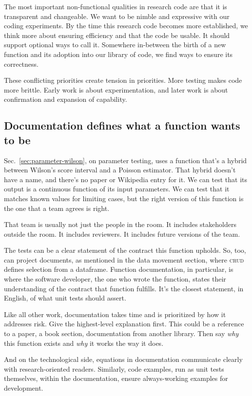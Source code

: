 \documentclass[fleqn,10pt]{olplainarticle}
\begin{document}
The most important non-functional qualities in research code are that it
is transparent and changeable. We want to be nimble and expressive
with our coding experiments. By the time this research code
becomes more established, we think more about ensuring efficiency
and that the code be usable. It should support optional ways to
call it. Somewhere in-between the birth of a new function and its
adoption into our library of code, we find ways to ensure its
correctness.

These conflicting priorities create tension in priorities.
More testing makes code more brittle. Early work is about
experimentation, and later work is about confirmation and
expansion of capability.


\subsection{Documentation defines what a function wants to be}

Sec.~\ref{sec:parameter-wilson}, on parameter testing, uses a function that's a hybrid
between Wilson's score interval and a Poisson estimator. That hybrid
doesn't have a name, and there's no paper or Wikipedia entry for it.
We can test that its output is a continuous function of its input
parameters. We can test that it matches known values for limiting cases,
but the right version of this function is the one that a team agrees
is right.

That team is usually not just the people in the room. It includes stakeholders
outside the room. It includes reviewers. It includes future versions of the team.

The tests can be a clear statement of the contract this function upholds.
So, too, can project documents, as mentioned in the data movement section,
where \textsc{crud} defines selection from a dataframe. 
Function documentation, in particular, is where the software
developer, the one who wrote the function, states their understanding
of the contract that function fulfills. It's the closest statement,
in English, of what unit tests should assert.

Like all other work, documentation takes time and is prioritized by
how it addresses risk. Give the highest-level explanation first.
This could be a reference to a paper, a book section, documentation from another library.
Then say \emph{why} this function exists and \emph{why} it works the
way it does.

And on the technological side, equations in documentation communicate
clearly with research-oriented readers. Similarly, code examples, run
as unit tests themselves, within the documentation, ensure always-working
examples for development.
\end{document}
